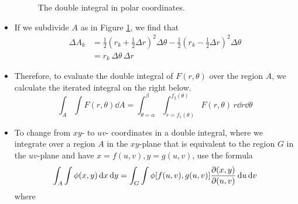 \documentclass[../main.tex]{subfiles}
\begin{document}
\begin{itemize}
\begin{figure}[h!]
        \caption{The double integral in polar coordinates.}
        \label{fig:polarDoubleIntegrals}
    \end{figure}
    \item If we subdivide $A$ as in Figure \ref{fig:polarDoubleIntegrals}, we find that
    \begin{align*}
        \Delta A_k &= \frac{1}{2}\left( r_k+\frac{1}{2}\Delta r \right)^2\Delta\theta-\frac{1}{2}\left( r_k-\frac{1}{2}\Delta r \right)^2\Delta\theta\\
        &= r_k\, \Delta\theta\, \Delta r
    \end{align*}
    \item Therefore, to evaluate the double integral of $F(r,\theta)$ over the region $A$, we calculate the iterated integral on the right below.
    \begin{equation*}
        \int_A\int F(r,\theta)\dd{A} = \int_{\theta=\alpha}^\beta\int_{r=f_1(\theta)}^{f_2(\theta)}F(r,\theta)\, r\dd{r}\dd{\theta}
    \end{equation*}
    \item To change from $xy$- to $uv$- coordinates in a double integral, where we integrate over a region $A$ in the $xy$-plane that is equivalent to the region $G$ in the $uv$-plane and have $x=f(u,v),y=g(u,v)$, use the formula
    \begin{equation*}
        \int_A\int\phi(x,y)\dd{x}\dd{y} = \int_G\int\phi[f(u,v),g(u,v)]\pdv{(x,y)}{(u,v)}\dd{u}\dd{v}
    \end{equation*}
    where
    \begin{equation*}

\end{equation*}
\end{itemize}
\end{document}
